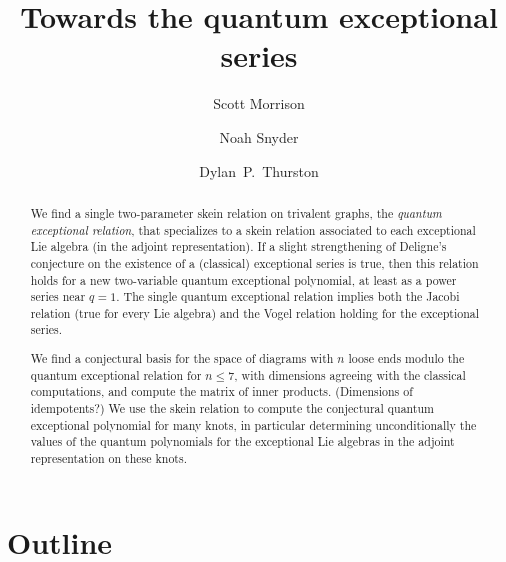 \documentclass[12pt]{amsart}
\begin{document}
\title{Towards the quantum exceptional series}

\author[Morrison]{Scott Morrison}
\address{Mathematical Sciences Institute, Australian National University}

\author[Snyder]{Noah Snyder}
\address{Bloomington, Indiana, USA}

\author[Thurston]{Dylan~P.~Thurston}
\address{Bloomington, Indiana, USA}

\begin{abstract}
  We find a single two-parameter skein relation on trivalent graphs,
  the \emph{quantum exceptional relation}, that specializes to a skein
  relation associated to each exceptional Lie algebra (in the adjoint
  representation). If a slight
  strengthening of Deligne's conjecture on the existence of a
  (classical) exceptional series is true, then this relation
  holds for a new two-variable quantum exceptional polynomial, at
  least as a power series near $q=1$. The
  single quantum exceptional relation implies both the
  Jacobi relation (true for every Lie algebra) and
  the Vogel relation holding for the exceptional series.

  We find a conjectural basis for the space of diagrams with $n$ loose
  ends modulo the quantum exceptional relation for $n \le 7$, with
  dimensions agreeing with the classical computations, and compute
  the matrix of inner products. (Dimensions of idempotents?)
  We use the
  skein relation to compute the conjectural quantum exceptional
  polynomial for many knots, in particular
  determining unconditionally the values of the quantum polynomials
  for the exceptional Lie algebras in the adjoint representation on
  these knots.
\end{abstract}


\maketitle

\tableofcontents

\section{Outline}
\label{sec:outline}
\end{document}
